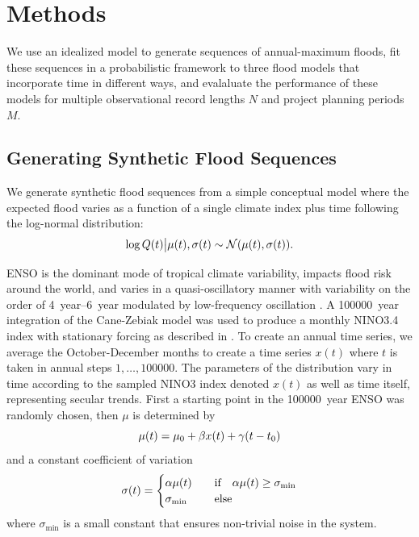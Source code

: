 \documentclass[12pt]{article}
\begin{document}
\section{Methods}\label{sec:methods}

We use an idealized model to generate sequences of annual-maximum floods, fit these sequences in a probabilistic framework to three flood models that incorporate time in different ways, and evalaluate the performance of these models for multiple observational record lengths \(N\) and project planning periods \(M\).

\subsection{Generating Synthetic Flood Sequences}

We generate synthetic flood sequences from a simple conceptual model where the expected flood varies as a function of a single climate index plus time following the log-normal distribution:
\begin{equation} \label{eq:lognormal}
  \log Q(t) \big| \mu(t),\sigma(t) \sim \mathcal{N} \qty(\mu(t), \sigma(t)).
\end{equation}

ENSO is the dominant mode of tropical climate variability, impacts flood risk around the world, and varies in a quasi-oscillatory manner with variability on the order of \SIrange{4}{6}{year} modulated by low-frequency oscillation \citep[see][for a comprehensive review]{Sarachik2010}.
A \SI{100000}{year} integration of the Cane-Zebiak model \citep{Zebiak1987} was used to produce a monthly NINO3.4 index with stationary forcing as described in \citep{Ramesh2017}.
To create an annual time series, we average the October-December months to create a time series \( x(t) \) where \( t \) is taken in annual steps \(1, \ldots, \num{100000} \).
The parameters of the distribution vary in time according to the sampled NINO3 index denoted \( x(t) \) as well as time itself, representing secular trends.
First a starting point in the \SI{100000}{year} ENSO was randomly chosen, then \(\mu\) is determined by
\begin{equation}
  \mu(t) = \mu_0 + \beta x(t) + \gamma \qty(t - t_0)
\end{equation}
and a constant coefficient of variation
\begin{equation}
  \sigma(t) = \begin{cases} \alpha \mu(t) & \qqtext{if} \alpha \mu(t) \geq \sigma_\text{min} \\ \sigma_\text{min} & \qqtext{else} \end{cases}
\end{equation}
where \(\sigma_\text{min}\) is a small constant that ensures non-trivial noise in the system.
\end{document}
